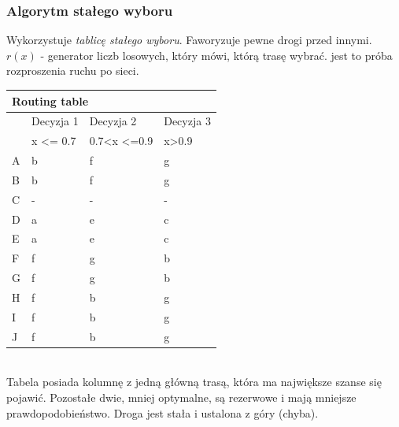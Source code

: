 			\subsubsection{Algorytm stałego wyboru}
				Wykorzystuje \textit{tablicę stałego wyboru}. Faworyzuje pewne drogi przed innymi. \\
				$ r(x) $ - generator liczb losowych, który mówi, którą trasę wybrać. jest to próba rozproszenia ruchu po sieci.\\
				\begin{tabular}{llll}
					\multicolumn{4}{l}{Routing table}                                                                                                  \\ \hline
					\multicolumn{1}{l|}{}  & \multicolumn{1}{l|}{Decyzja 1}         & \multicolumn{1}{l|}{Decyzja 2}                            &  \multicolumn{1}{l|}{Decyzja 3}              \\ \hline
					\multicolumn{1}{l|}{}  & \multicolumn{1}{l|}{x \textless= 0.7} & \multicolumn{1}{l|}{0.7\textless x \textless=0.9} & x\textgreater0.9 \\ \hline
					\multicolumn{1}{l|}{A} & \multicolumn{1}{l|}{b}                & \multicolumn{1}{l|}{f}                           & g               \\
					\multicolumn{1}{l|}{B} & \multicolumn{1}{l|}{b}                & \multicolumn{1}{l|}{f}                           & g               \\
					\multicolumn{1}{l|}{C} & \multicolumn{1}{l|}{-}                & \multicolumn{1}{l|}{-}                           & -              \\
					\multicolumn{1}{l|}{D} & \multicolumn{1}{l|}{a}                & \multicolumn{1}{l|}{e}                           & c              \\
					\multicolumn{1}{l|}{E} & \multicolumn{1}{l|}{a}                & \multicolumn{1}{l|}{e}                           & c              \\
					\multicolumn{1}{l|}{F} & \multicolumn{1}{l|}{f}                & \multicolumn{1}{l|}{g}                           & b               \\
					\multicolumn{1}{l|}{G} & \multicolumn{1}{l|}{f}                & \multicolumn{1}{l|}{g}                           & b               \\
					\multicolumn{1}{l|}{H} & \multicolumn{1}{l|}{f}                & \multicolumn{1}{l|}{b}                           & g               \\
					\multicolumn{1}{l|}{I} & \multicolumn{1}{l|}{f}                & \multicolumn{1}{l|}{b}                           & g               \\
					\multicolumn{1}{l|}{J} & \multicolumn{1}{l|}{f}                & \multicolumn{1}{l|}{b}                           & g              
				\end{tabular}\\
				Tabela posiada kolumnę z jedną główną trasą, która ma największe szanse się pojawić. Pozostałe dwie, mniej optymalne, są rezerwowe i mają mniejsze prawdopodobieństwo. Droga jest stała i ustalona z góry (chyba).
